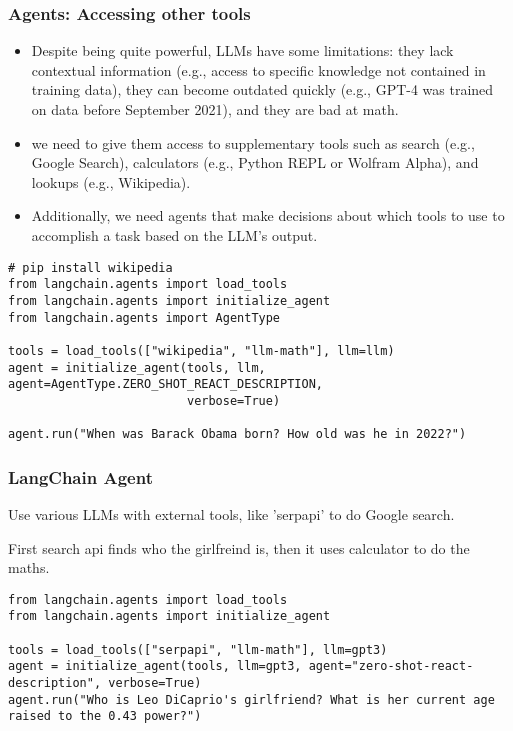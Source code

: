 \begin{frame}[fragile]\frametitle{Agents: Accessing other tools}


\begin{itemize}
\item Despite being quite powerful, LLMs have some limitations: they lack contextual information (e.g., access to specific knowledge not contained in training data), they can become outdated quickly (e.g., GPT-4 was trained on data before September 2021), and they are bad at math.
\item we need to give them access to supplementary tools such as search (e.g., Google Search), calculators (e.g., Python REPL or Wolfram Alpha), and lookups (e.g., Wikipedia).
\item Additionally, we need agents that make decisions about which tools to use to accomplish a task based on the LLM’s output.
\end{itemize}

\begin{lstlisting}
# pip install wikipedia
from langchain.agents import load_tools
from langchain.agents import initialize_agent
from langchain.agents import AgentType

tools = load_tools(["wikipedia", "llm-math"], llm=llm)
agent = initialize_agent(tools, llm, agent=AgentType.ZERO_SHOT_REACT_DESCRIPTION, 
                         verbose=True)

agent.run("When was Barack Obama born? How old was he in 2022?")
\end{lstlisting}


\end{frame}


\begin{frame}[fragile]\frametitle{LangChain Agent}

Use various LLMs with external tools, like 'serpapi' to do Google search.

First search api finds who the girlfreind is, then it uses calculator to do the maths.

\begin{lstlisting}
from langchain.agents import load_tools
from langchain.agents import initialize_agent

tools = load_tools(["serpapi", "llm-math"], llm=gpt3)
agent = initialize_agent(tools, llm=gpt3, agent="zero-shot-react-description", verbose=True)
agent.run("Who is Leo DiCaprio's girlfriend? What is her current age raised to the 0.43 power?")
\end{lstlisting}	  

\end{frame}

